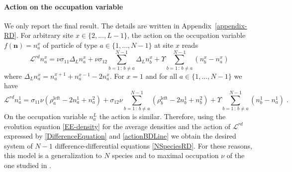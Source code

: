\documentclass[10pt]{article}
\numberwithin{equation}{section}
\numberwithin{equation}{subsection}
\newcommand{\dt}{\;.}
\begin{document}
\paragraph{Action on the occupation variable}
We only report the final result. The details are written in Appendix~\ref{appendix-RD}. For arbitrary site $x\in \{2,\ldots,L-1\}$, the action on the occupation variable $f(\bm{n})=n_{a}^{x}$ of particle of type $a\in \{1,\ldots,N-1\}$ at site $x$ reads
\begin{equation}\label{DifferenceEquation}
	\mathcal{L}^{rd}n_{a}^{x}=\nu\sigma_{11}\Delta_{L}n_{a}^{x}+\nu\sigma_{12}\sum_{b=1\,:\,b\neq a}^{N-1}\Delta_{L}n_{b}^{x}+\Upsilon\sum_{b=1\,:\,b\neq a}^{N-1}(n_{b}^{x}-n_{a}^{x})
\end{equation}
where $\Delta_{L}n_{a}^{x}= n_{a}^{x+1}+n_{a}^{x-1}-2n_{a}^{x}$. For $x=1$ and for all $a\in \{1,\ldots,N-1\}$ we have 
\begin{equation}\label{actionBDLine}
	\mathcal{L}^{rd}n_{a}^{1}=\sigma_{11}\nu \left(\rho_{a}^{\text{left}}-2n_{a}^{1}+n_{a}^{2}\right)+\sigma_{12}\nu\sum_{b=1\,:\,b\neq a}^{N-1}\left(\rho_{b}^{\text{left}}-2n_{b}^{1}+n_{b}^{2}\right)+\Upsilon\sum_{b=1\,:\,b\neq a}^{N-1}\left(n_{b}^{1}-n_{a}^{1}\right)\dt
\end{equation}
On the occupation variable $n_{a}^{L}$ the action is similar. Therefore, using the evolution equation \eqref{EE-density} for the average densities and  the action of $\mathcal{L}^{rd}$ expressed by \eqref{DifferenceEquation} and \eqref{actionBDLine} we obtain the desired system of $N-1$ difference-differential equations \eqref{NSpeciesRD}. For these reasons, this model is a generalization to $N$ species and to maximal occupation $\nu$ of the one studied in \cite{casini2022uphill}. 
\end{document}
